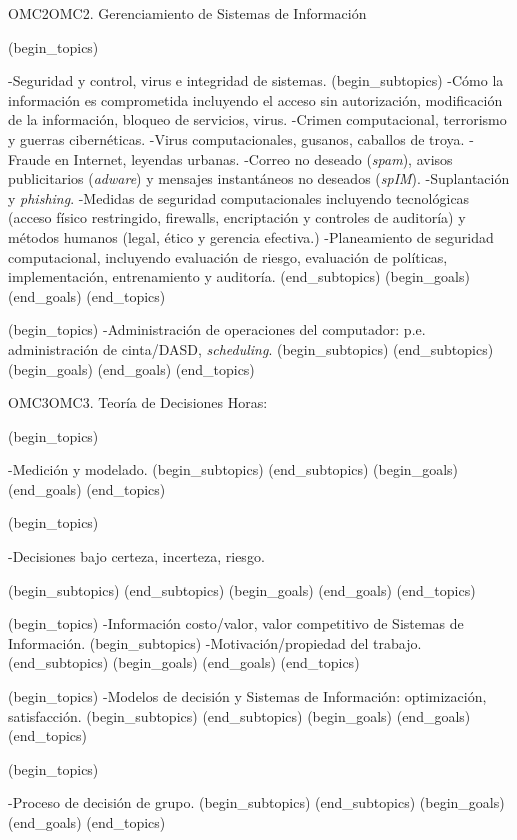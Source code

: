 \begin{BKL2}{OMC2}{OMC2. Gerenciamiento de Sistemas de Información}
 

(begin_topics)

-Seguridad y control, virus e integridad de sistemas.
(begin_subtopics)
-Cómo la información es comprometida incluyendo el acceso sin autorización, modificación de la información, bloqueo de servicios, virus.
-Crimen computacional, terrorismo y guerras cibernéticas.
-Virus computacionales, gusanos, caballos de troya.
-Fraude en Internet, leyendas urbanas.
-Correo no deseado (\emph{spam}), avisos publicitarios (\emph{adware}) y mensajes instantáneos no deseados (\emph{spIM}).
-Suplantación y \emph{phishing}.
-Medidas de seguridad computacionales incluyendo tecnológicas (acceso físico restringido, firewalls, encriptación y controles de auditoría) y métodos humanos (legal, ético y gerencia efectiva.)
-Planeamiento de seguridad computacional, incluyendo evaluación de riesgo, evaluación de políticas, implementación, entrenamiento y auditoría.
(end_subtopics)
(begin_goals)
(end_goals)
(end_topics)

(begin_topics)
-Administración de operaciones del computador: p.e. administración de cinta/DASD, {\it scheduling}.
(begin_subtopics)
(end_subtopics)
(begin_goals)
(end_goals)
(end_topics)

\end{BKL2}



\begin{BKL2}{OMC3}{OMC3. Teoría de Decisiones}
Horas:
 
(begin_topics)

-Medición y modelado.
(begin_subtopics)
(end_subtopics)
(begin_goals)
(end_goals)
(end_topics)

 

(begin_topics)

-Decisiones bajo certeza, incerteza, riesgo.

(begin_subtopics)
(end_subtopics)
(begin_goals)
(end_goals)
(end_topics)

 

(begin_topics)
-Información costo/valor, valor competitivo de Sistemas de Información.
(begin_subtopics)
-Motivación/propiedad del trabajo.
(end_subtopics)
(begin_goals)
(end_goals)
(end_topics)

 

(begin_topics)
-Modelos de decisión y Sistemas de Información: optimización, satisfacción.
(begin_subtopics)
(end_subtopics)
(begin_goals)
(end_goals)
(end_topics)

 

(begin_topics)

-Proceso de decisión de grupo.
(begin_subtopics)
(end_subtopics)
(begin_goals)
(end_goals)
(end_topics)

\end{BKL2}



